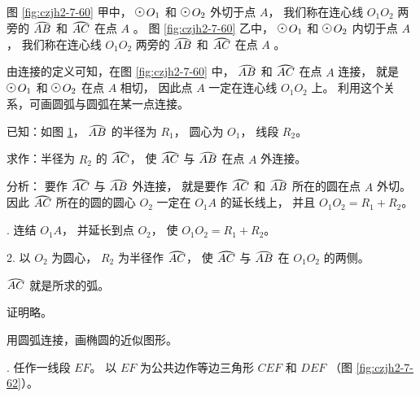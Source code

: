 图 \ref{fig:czjh2-7-60} 甲中， $\yuan\,O_1$ 和 $\yuan\,O_2$ 外切于点 $A$，
我们称在连心线 $O_1O_2$ 两旁的 $\yuanhu{AB}$ 和 $\yuanhu{AC}$ 在点 $A$ 。
图 \ref{fig:czjh2-7-60} 乙中， $\yuan\,O_1$ 和 $\yuan\,O_2$ 内切于点 $A$，
我们称在连心线 $O_1O_2$ 两旁的 $\yuanhu{AB}$ 和 $\yuanhu{AC}$ 在点 $A$ 。

由连接的定义可知，在图 \ref{fig:czjh2-7-60} 中， $\yuanhu{AB}$ 和 $\yuanhu{AC}$ 在点 $A$ 连接，
就是 $\yuan\,O_1$ 和 $\yuan\,O_2$ 在点 $A$ 相切， 因此点 $A$ 一定在连心线 $O_1O_2$ 上。
利用这个关系，可画圆弧与圆弧在某一点连接。


\liti 已知：如图 \ref{fig:czjh2-7-61}， $\yuanhu{AB}$ 的半径为 $R_1$， 圆心为 $O_1$， 线段 $R_2$。

\begin{figure}
    \centering
    
    \caption{}\label{fig:czjh2-7-61}
\end{figure}

求作：半径为 $R_2$ 的 $\yuanhu{AC}$， 使 $\yuanhu{AC}$ 与 $\yuanhu{AB}$ 在点 $A$ 外连接。

分析： 要作 $\yuanhu{AC}$ 与 $\yuanhu{AB}$ 外连接，
就是要作 $\yuanhu{AC}$ 和 $\yuanhu{AB}$ 所在的圆在点 $A$ 外切。
因此 $\yuanhu{AC}$ 所在的圆的圆心 $O_2$ 一定在 $O_1A$ 的延长线上，
并且 $O_1O_2 = R_1 + R_2$。

. 连结 $O_1A$， 并延长到点 $O_2$， 使 $O_1O_2 = R_1 + R_2$。

2. 以 $O_2$ 为圆心， $R_2$ 为半径作 $\yuanhu{AC}$， 使 $\yuanhu{AC}$ 与 $\yuanhu{AB}$ 在 $O_1O_2$ 的两侧。

$\yuanhu{AC}$ 就是所求的弧。

证明略。

%         


\liti 用圆弧连接，画椭圆的近似图形。

. 任作一线段 $EF$。 以 $EF$ 为公共边作等边三角形 $CEF$ 和 $DEF$ （图 \ref{fig:czjh2-7-62}）。

